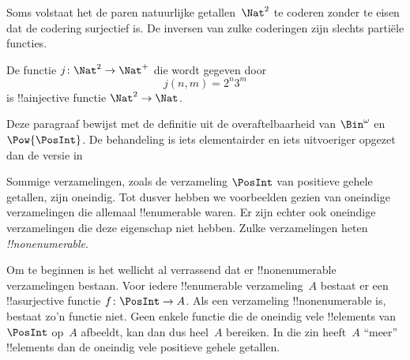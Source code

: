 \documentclass[openany]{memoir}
\begin{document}
Soms volstaat het de paren natuurlijke getallen~$\Nat^2$ te coderen zonder te
eisen dat de codering surjectief is. De inversen van zulke coderingen zijn
slechts partiële functies.

\begin{ex}
De functie $j\colon \Nat^2 \to \Nat^+$ die wordt gegeven door
\[
j(n,m) = 2^n3^m
\]
is !!a{injective} functie $\Nat^2 \to \Nat$.
\end{ex}
\endgroup

\begingroup
\def\olfilename{OLP-0033}
\def\olfilepath{content/sets-functions-relations/size-of-sets/}
\hypertarget{unit-OLP-0033}{}





\begin{editorial}
  Deze paragraaf bewijst met de definitie uit  de
  overaftelbaarheid van $\Bin^\omega$ en $\Pow{\PosInt}$. De behandeling
  is iets elementairder en iets uitvoeriger opgezet dan de versie in
\end{editorial}

Sommige verzamelingen, zoals de verzameling $\PosInt$ van positieve
gehele getallen, zijn oneindig. Tot dusver hebben we voorbeelden gezien
van oneindige verzamelingen die allemaal !!{enumerable} waren. Er zijn
echter ook oneindige verzamelingen die deze eigenschap niet hebben. Zulke
verzamelingen heten \emph{!!{nonenumerable}}.

Om te beginnen is het wellicht al verrassend dat er
!!{nonenumerable} verzamelingen bestaan. Voor iedere !!{enumerable}
verzameling~$A$ bestaat er een !!a{surjective} functie $f \colon \PosInt
\to A$. Als een verzameling !!{nonenumerable} is, bestaat zo'n functie
niet. Geen enkele functie die de oneindig vele !!{element}s van~$\PosInt$
op~$A$ afbeeldt, kan dan dus heel~$A$ bereiken. In die zin heeft~$A$
``meer'' !!{element}s dan de oneindig vele positieve gehele getallen.
\end{document}
